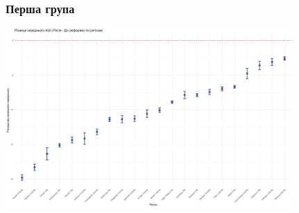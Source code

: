 \documentclass{beamer}
\begin{document}
\begin{frame}
  \frametitle{Перша група}

  \begin{center}
    \includegraphics[height=2.7in]{./plots/lab2/1-4-part/aqi_difference_by_region.png}
  \end{center}
  
\end{frame}
\end{document}
